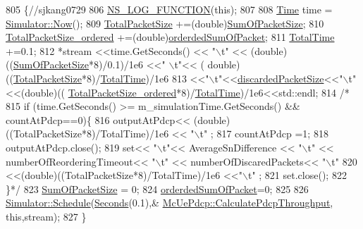 \begin{DoxyCode}
805                                                     \{\textcolor{comment}{//sjkang0729}
806         \hyperlink{log-macros-disabled_8h_a90b90d5bad1f39cb1b64923ea94c0761}{NS\_LOG\_FUNCTION}(\textcolor{keyword}{this});
807 
808         \hyperlink{namespacens3_1_1TracedValueCallback_a7ffd3e7c142ffe7c8a1d2db9b8de38ec}{Time} time = \hyperlink{classns3_1_1Simulator_ac3178fa975b419f7875e7105be122800}{Simulator::Now}();
809    \hyperlink{classns3_1_1McUePdcp_a5fe66d567481a6564a7d889cdf49da00}{TotalPacketSize} +=(double)\hyperlink{classns3_1_1McUePdcp_aa92d2c898262670a1c474254130e2f8a}{SumOfPacketSize};
810    \hyperlink{classns3_1_1McUePdcp_a170d7342cb9d9fe7d213ae4a8d946d9c}{TotalPacketSize\_ordered} +=(double)\hyperlink{classns3_1_1McUePdcp_a1da60410561fa64f53e7d6ea141dab5d}{orderdedSumOfPacket};
811                 \hyperlink{classns3_1_1McUePdcp_a490ce73b120d8f2b876182f4390f554a}{TotalTime} +=0.1;
812  *stream <<time.GetSeconds() << \textcolor{stringliteral}{"\(\backslash\)t"} << (double)((\hyperlink{classns3_1_1McUePdcp_aa92d2c898262670a1c474254130e2f8a}{SumOfPacketSize}*8)/0.1)/1e6 <<\textcolor{stringliteral}{" \(\backslash\)t"}<< (
      double)((\hyperlink{classns3_1_1McUePdcp_a5fe66d567481a6564a7d889cdf49da00}{TotalPacketSize}*8)/\hyperlink{classns3_1_1McUePdcp_a490ce73b120d8f2b876182f4390f554a}{TotalTime})/1e6
813                  <<\textcolor{stringliteral}{"\(\backslash\)t"}<<\hyperlink{classns3_1_1McUePdcp_ae7935800f033c5e63ec66e18c6c91776}{discardedPacketSize}<<\textcolor{stringliteral}{"\(\backslash\)t"}<<(\textcolor{keywordtype}{double})((
      \hyperlink{classns3_1_1McUePdcp_a170d7342cb9d9fe7d213ae4a8d946d9c}{TotalPacketSize\_ordered}*8)/\hyperlink{classns3_1_1McUePdcp_a490ce73b120d8f2b876182f4390f554a}{TotalTime})/1e6<<std::endl;
814 \textcolor{comment}{/*}
815 \textcolor{comment}{if (time.GetSeconds() >= m\_simulationTime.GetSeconds() && countAtPdcp==0)\{}
816 \textcolor{comment}{        outputAtPdcp<<  (double)((TotalPacketSize*8)/TotalTime)/1e6 << "\(\backslash\)t"  ;}
817 \textcolor{comment}{        countAtPdcp =1;}
818 \textcolor{comment}{        outputAtPdcp.close();}
819 \textcolor{comment}{        set<< "\(\backslash\)t"<< AverageSnDifference <<  "\(\backslash\)t" << numberOfReorderingTimeout<< "\(\backslash\)t" <<
       numberOfDiscaredPackets<< "\(\backslash\)t"}
820 \textcolor{comment}{                        <<(double)((TotalPacketSize*8)/TotalTime)/1e6 <<"\(\backslash\)t" ;}
821 \textcolor{comment}{        set.close();}
822 \textcolor{comment}{        \}*/}
823         \hyperlink{classns3_1_1McUePdcp_aa92d2c898262670a1c474254130e2f8a}{SumOfPacketSize} = 0;
824         \hyperlink{classns3_1_1McUePdcp_a1da60410561fa64f53e7d6ea141dab5d}{orderdedSumOfPacket}=0;
825 
826           \hyperlink{classns3_1_1Simulator_a671882c894a08af4a5e91181bf1eec13}{Simulator::Schedule}(\hyperlink{group__timecivil_ga33c34b816f8ff6628e33d5c8e9713b9e}{Seconds}(0.1),&
      \hyperlink{classns3_1_1McUePdcp_ac3586f5dc45afc13156dcbec5ab6cac4}{McUePdcp::CalculatePdcpThroughput}, \textcolor{keyword}{this},stream);
827 \}
\end{DoxyCode}


